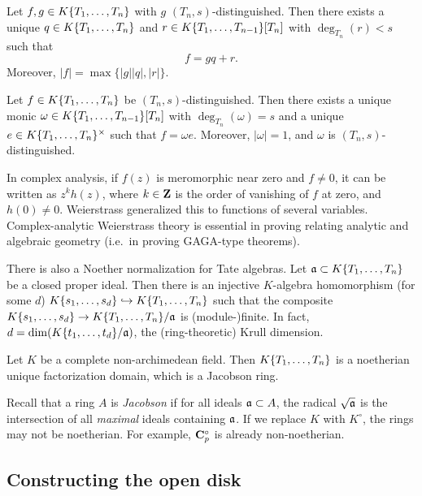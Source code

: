 \begin{theorem}
Let $f,g\in K\{ T_1,\dots,T_n \}$ with $g$ 
$(T_n,s)$-distinguished. Then there exists a unique 
$q\in K\{ T_1,\dots,T_n \}$ and $r\in K\{ T_1,\dots,T_{n-1} \}[T_n]$ with 
$\deg_{T_n}(r)<s$ such that 
\[
	f = g q+r .
\]
Moreover, $|f|=\max\{|g||q|,|r|\}$. 
\end{theorem}

\begin{theorem}
Let $f\in K\{ T_1,\dots,T_n \}$ be $(T_n,s)$-distinguished. Then there 
exists a unique monic $\omega\in K\{ T_1,\dots,T_{n-1} \}[T_n]$ with 
$\deg_{T_n}(\omega) = s$ and a unique $e\in K\{ T_1,\dots,T_n \}^\times$ 
such that $f=\omega e$. Moreover, $|\omega|=1$, and $\omega$ is 
$(T_n,s)$-distinguished. 
\end{theorem}

In complex analysis, if $f(z)$ is meromorphic near zero and $f\ne 0$, it can be 
written as $z^k h(z)$, where $k\in \mathbf{Z}$ is the order of vanishing of $f$ at 
zero, and $h(0)\ne 0$. Weierstrass generalized this to functions of several 
variables. Complex-analytic Weierstrass theory is essential in proving relating 
analytic and algebraic geometry (i.e.~in proving GAGA-type theorems). 

There is also a Noether normalization for Tate algebras. Let 
$\mathfrak{a}\subset K\{ T_1,\dots,T_n \}$ be a closed proper ideal. Then there is 
an injective $K$-algebra homomorphism (for some $d$) 
$K\{ s_1,\dots,s_d \} \hookrightarrow K\{ T_1,\dots,T_n \}$ such that 
the composite $K\{ s_1,\dots,s_d \} \to K\{ T_1,\dots,T_n \}/\mathfrak{a}$ is 
(module-)finite. In fact, $d=\dim(K\{ t_1,\dots,t_d \}/\mathfrak{a})$, the 
(ring-theoretic) Krull dimension. 

\begin{theorem}
Let $K$ be a complete non-archimedean field. Then $K\{ T_1,\dots,T_n \}$ is 
a noetherian unique factorization domain, which is a Jacobson ring. 
\end{theorem}

Recall that a ring $A$ is \emph{Jacobson} if for all ideals $\mathfrak{a}\subset A$, the 
radical $\sqrt{\mathfrak{a}}$ is the intersection of all \emph{maximal} ideals 
containing $\mathfrak{a}$. If we replace $K$ with $K^\circ$, the rings may not be 
noetherian. For example, $\mathbf{C}_p^\circ$ is already non-noetherian. 


\subsection{Constructing the open disk}

